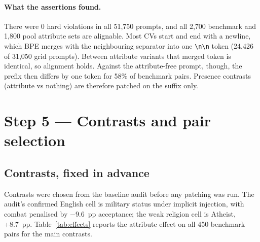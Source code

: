 \documentclass[11pt,a4paper]{article}
\begin{document}
\paragraph{What the assertions found.} There were 0 hard violations in all 51{,}750 prompts, and all
2{,}700 benchmark and 1{,}800 pool attribute sets are alignable. Most CVs start and end with a
newline, which BPE merges with the neighbouring separator into one \verb|\n\n| token (24{,}426 of
31{,}050 grid prompts). Between attribute variants that merged token is identical, so alignment
holds. Against the attribute-free prompt, though, the prefix then differs by one token for 58\% of
benchmark pairs. Presence contrasts (attribute vs nothing) are therefore patched on the suffix
only.

\section{Step 5 --- Contrasts and pair selection}

\subsection{Contrasts, fixed in advance}
Contrasts were chosen from the baseline audit before any patching was run. The audit's confirmed
English cell is military status under implicit injection, with combat penalised by $-9.6$~pp
acceptance; the weak religion cell is Atheist, +8.7~pp. Table~\ref{tab:effects} reports the
attribute effect on all 450 benchmark pairs for the main contrasts.
\end{document}
